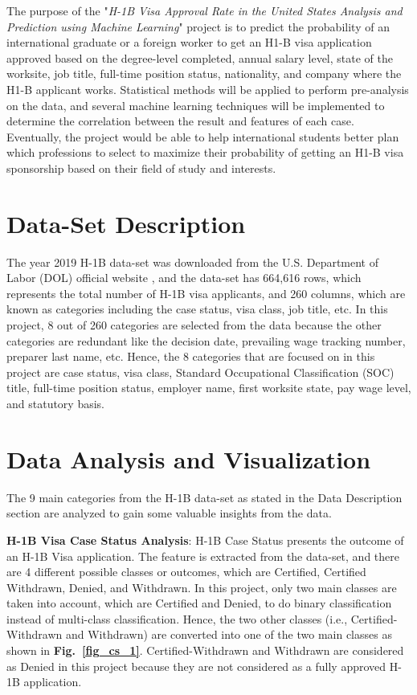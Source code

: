 \documentclass[conference]{IEEEtran}
\begin{document}
The purpose of the "\emph{H-1B Visa Approval Rate in the United States Analysis and Prediction using Machine Learning}" project is to predict the probability of an international graduate or a foreign worker to get an H1-B visa application approved based on the degree-level completed, annual salary level, state of the worksite, job title, full-time position status, nationality, and company where the H1-B applicant works. Statistical methods will be applied to perform pre-analysis on the data, and several machine learning techniques will be implemented to determine the correlation between the result and features of each case. Eventually, the project would be able to help international students better plan which professions to select to maximize their probability of getting an H1-B visa sponsorship based on their field of study and interests.

\section{Data-Set Description}
\label{s2}

The year 2019 H-1B data-set was downloaded from the U.S. Department of Labor (DOL) official website \cite{b6}, and the data-set has 664,616 rows, which represents the total number of H-1B visa applicants, and 260 columns, which are known as categories including the case status, visa class, job title, etc. In this project, 8 out of 260 categories are selected from the data because the other categories are redundant like the decision date, prevailing wage tracking number, preparer last name, etc. Hence, the 8 categories that are focused on in this project are case status, visa class, Standard Occupational Classification (SOC) title, full-time position status, employer name, first worksite state, pay wage level, and statutory basis.

\section{Data Analysis and Visualization}
\label{s3}

The 9 main categories from the H-1B data-set as stated in the Data Description section are analyzed to gain some valuable insights from the data.

\textbf{H-1B Visa Case Status Analysis}: H-1B Case Status presents the outcome of an H-1B Visa application. The feature is extracted from the data-set, and there are 4 different possible classes or outcomes, which are Certified, Certified Withdrawn, Denied, and Withdrawn. In this project, only two main classes are taken into account, which are Certified and Denied, to do binary classification instead of multi-class classification. Hence, the two other classes (i.e., Certified-Withdrawn and Withdrawn) are converted into one of the two main classes as shown in \textbf{Fig.~\ref{fig_cs_1}}. Certified-Withdrawn and Withdrawn are considered as Denied in this project because they are not considered as a fully approved H-1B application.
\end{document}
